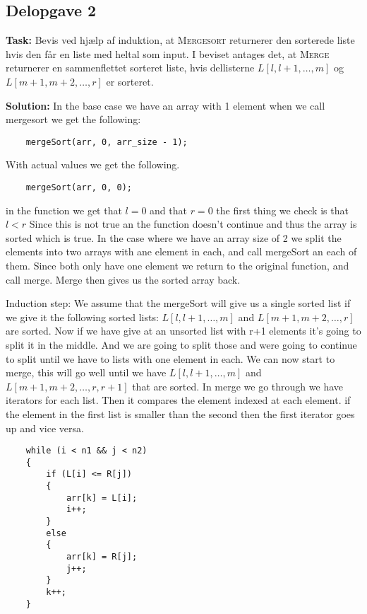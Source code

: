 \subsection{Delopgave 2}
\textbf{Task:}  Bevis ved hjælp af induktion, at \textsc{Mergesort} returnerer den sorterede liste hvis den får en liste med heltal som input. I beviset antages det, at \textsc{Merge} returnerer en sammenflettet sorteret liste, hvis dellisterne $L[l,l+1,\ldots,m]$ og $L[m+1,m+2,\ldots,r]$ er sorteret.

\bigskip
\noindent
\textbf{Solution:} In the base case we have an array with 1 element when we call mergesort we get the following:

\begin{lstlisting}
    mergeSort(arr, 0, arr_size - 1);
\end{lstlisting}

With actual values we get the following.

\begin{lstlisting}
    mergeSort(arr, 0, 0);
\end{lstlisting}

in the function we get that $l = 0$ and that $r = 0$ the first thing we check is that $l<r$ Since this is not true an the function doesn't continue and thus the array is sorted which is true. 
In the case where we have an array size of 2 we split the elements into two arrays with ane element in each, and call mergeSort an each of them. Since both only have one element we return to the original function, and call merge. Merge then gives us the sorted array back.

Induction step:
We assume that the mergeSort will give us a single sorted list if we give it the following sorted lists: $L[l,l+1,\ldots,m]$ and $L[m+1,m+2,\ldots,r]$ are sorted.
Now if we have give at an unsorted list with r+1 elements it's going to split it in the middle. And we are going to split those and were going to continue to split until we have to lists with one element in each. We can now start to merge, this will go well until we have $L[l,l+1,\ldots,m]$ and $L[m+1,m+2,\ldots,r, r+1]$ that are sorted.
In merge we go through we have iterators for each list. Then it compares the element indexed at each element. if the element in the first list is smaller than the second then the first iterator goes up and vice versa.

\begin{lstlisting}
    while (i < n1 && j < n2) 
    { 
        if (L[i] <= R[j]) 
        { 
            arr[k] = L[i]; 
            i++; 
        } 
        else
        { 
            arr[k] = R[j]; 
            j++; 
        } 
        k++; 
    } 
\end{lstlisting}

